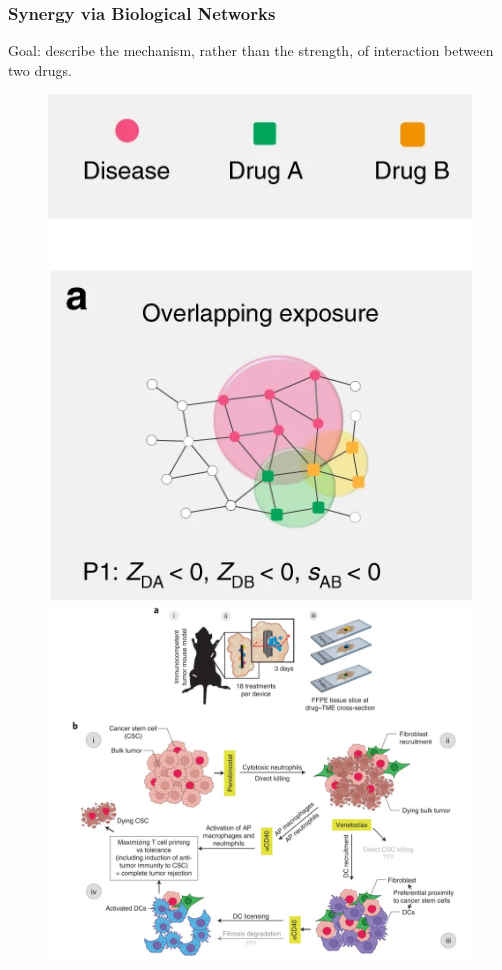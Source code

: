 \documentclass{beamer}
\begin{document}
\begin{frame}
  \frametitle{Synergy via Biological Networks}
  Goal: describe the mechanism, rather than the strength, of interaction between two drugs.
  \vfill
  \begin{figure}
    \centering
      \includegraphics[width=\linewidth]{figs/barabasi-hypertension-overlapping-net.png}
    \endminipage\hfill 
      \includegraphics[width=\linewidth]{figs/TME_example.png}
    \endminipage
  \end{figure}
\end{frame}
\end{document}
